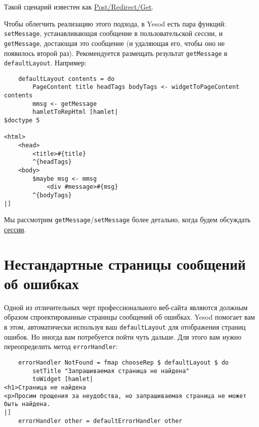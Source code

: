 \begin{remark}
    Такой сценарий известен как
    \href{http://en.wikipedia.org/wiki/Post/Redirect/Get}{Post/Redirect/Get}\footnotemark[\value{footnote}].
\end{remark}


Чтобы облегчить реализацию этого подхода, в Yesod есть пара функций:
\lstinline!setMessage!, устанавливающая сообщение в пользовательской сессии, и
\lstinline!getMessage!, достающая это сообщение (и удаляющая его, чтобы оно не
появилось второй раз). Рекомендуется размещать результат \lstinline!getMessage!
в \lstinline!defaultLayout!. Например:

\begin{lstlisting}
    defaultLayout contents = do
        PageContent title headTags bodyTags <- widgetToPageContent contents
        mmsg <- getMessage
        hamletToRepHtml [hamlet|
$doctype 5

<html>
    <head>
        <title>#{title}
        ^{headTags}
    <body>
        $maybe msg <- mmsg
            <div #message>#{msg}
        ^{bodyTags}
|]
\end{lstlisting}%

Мы рассмотрим \lstinline!getMessage!/\lstinline!setMessage! более детально,
когда будем обсуждать \hyperref[chap:sessions]{сессии}.

\section {Нестандартные страницы сообщений об ошибках}

Одной из отличительных черт профессионального веб-сайта являются должным
образом спроектированные страницы сообщений об ошибках. Yesod помогает вам в
этом, автоматически используя ваш \lstinline!defaultLayout! для отображения
страниц ошибок. Но иногда вам потребуется пойти чуть дальше. Для этого вам
нужно переопределить метод \lstinline!errorHandler!:

\begin{lstlisting}
    errorHandler NotFound = fmap chooseRep $ defaultLayout $ do
        setTitle "Запрашиваемая страница не найдена"
        toWidget [hamlet|
<h1>Страница не найдена
<p>Просим прощения за неудобства, но запрашиваемая страница не может быть найдена.
|]
    errorHandler other = defaultErrorHandler other
\end{lstlisting}

